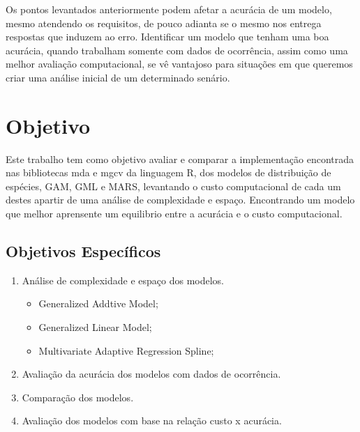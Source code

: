 \documentclass[
	12pt,				%
	openright,			%
	oneside,			%
	a4paper,			%
	english,			%
	brazil				%
	]{abntex2}
\begin{document}
Os pontos levantados anteriormente podem afetar a acurácia de um modelo, mesmo atendendo os requisitos, 
de pouco adianta se o mesmo nos entrega respostas que induzem ao erro. Identificar um modelo que tenham uma boa acurácia, 
quando trabalham somente com dados de ocorrência, assim como uma melhor avaliação computacional, se vê vantajoso para 
situações em que queremos criar uma análise inicial de um determinado senário.

\section{Objetivo}

Este trabalho tem como objetivo avaliar e comparar a implementação encontrada nas bibliotecas mda e mgcv da linguagem R, dos modelos
de distribuição de espécies, GAM, GML e MARS, levantando o custo computacional de cada um destes apartir de uma análise de 
complexidade e espaço. Encontrando um modelo que melhor aprensente um equilibrio entre a acurácia e o custo computacional.

\subsection{Objetivos Específicos}

\begin{enumerate}
	\item Análise de complexidade e espaço dos modelos.
	\begin{itemize}
		\item Generalized Addtive Model;
		\item Generalized Linear Model;
		\item Multivariate Adaptive Regression Spline;
	\end{itemize}
	\item Avaliação da acurácia dos modelos com dados de ocorrência.
	\item Comparação dos modelos.
	\item Avaliação dos modelos com base na relação custo x acurácia.
\end{enumerate}

\end{document}
